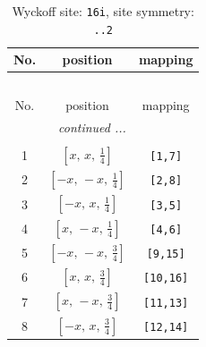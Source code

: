 \documentclass[fleqn,8pt]{jsarticle}
\begin{document}
\renewcommand{\arraystretch}{1.2}
\begin{longtable}{ccc}
\caption{Wyckoff site: {\tt 16i}, site symmetry: {\tt ..2}}
 \\
 \hline \hline
No. & position & mapping \\ \hline \endfirsthead

\multicolumn{2}{l}{\tablename\ \thetable{}} \\
 \hline \hline
No. & position & mapping \\ \hline \endhead

 \hline \hline
\multicolumn{2}{r}{\footnotesize\it continued ...} \\ \endfoot

 \hline \hline
\multicolumn{2}{r}{} \\ \endlastfoot

1 & $\left[ x,\, x,\, \frac{1}{4} \right]$ & {\tt [1,7]} \\ \hline
2 & $\left[ - x,\, - x,\, \frac{1}{4} \right]$ & {\tt [2,8]} \\ \hline
3 & $\left[ - x,\, x,\, \frac{1}{4} \right]$ & {\tt [3,5]} \\ \hline
4 & $\left[ x,\, - x,\, \frac{1}{4} \right]$ & {\tt [4,6]} \\ \hline
5 & $\left[ - x,\, - x,\, \frac{3}{4} \right]$ & {\tt [9,15]} \\ \hline
6 & $\left[ x,\, x,\, \frac{3}{4} \right]$ & {\tt [10,16]} \\ \hline
7 & $\left[ x,\, - x,\, \frac{3}{4} \right]$ & {\tt [11,13]} \\ \hline
8 & $\left[ - x,\, x,\, \frac{3}{4} \right]$ & {\tt [12,14]} \\
\end{longtable}
\renewcommand{\arraystretch}{1.2}
\end{document}
